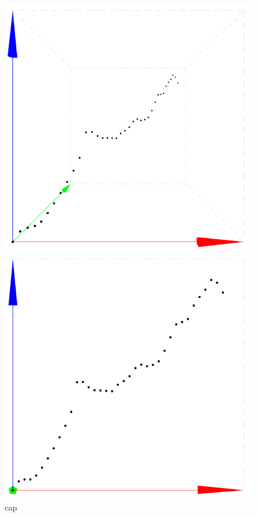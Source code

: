 \begin{figure}[!htbp]
	\centering
	\begin{minipage}{.45\textwidth}
		\includegraphics[width=\linewidth]{images/persp}
	\end{minipage}
	\begin{minipage}{.45\textwidth}
		\includegraphics[width=\linewidth]{images/ortho}
	\end{minipage}
	\caption[cap]{cap}
	\label{fig:projections}
\end{figure}